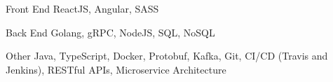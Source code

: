 


\begin{cvskills}


\cvskill
{Front End} %
{ReactJS, Angular, SASS} %


\cvskill
{Back End} %
{Golang, gRPC, NodeJS, SQL, NoSQL} %


\cvskill
{Other} %
{Java, TypeScript, Docker, Protobuf, Kafka, Git, CI/CD (Travis and Jenkins), RESTful APIs, Microservice Architecture} %


\end{cvskills}